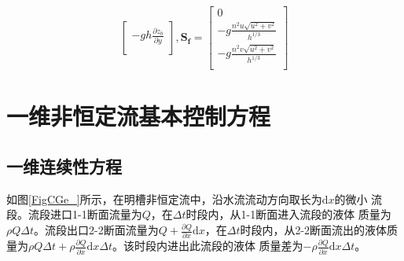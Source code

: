 \begin{equation}
\begin{bmatrix}
                                                            -gh\frac{\partial z_{b}}{\partial y} \\
                                                          \end{bmatrix}
                                                          ,
                                                          \mathbf{S_{f}} =
                                                          \begin{bmatrix}
                                                            0 \\
                                                            -g\frac{n^{2}u\sqrt{u^2+v^2}}{h^{1/3}} \\
                                                            -g\frac{n^{2}v\sqrt{u^2+v^2}}{h^{1/3}} \\
                                                          \end{bmatrix}
                                                        \end{equation}


                                                        \section{一维非恒定流基本控制方程}
                                                        \subsection{一维连续性方程}
                                                        如图\ref{FigCGe_}所示，在明槽非恒定流中，沿水流流动方向取长为$\mathrm{d}x$的微小
                                                        流段。流段进口1-1断面流量为$Q$，在$\Delta t$时段内，从1-1断面进入流段的液体
                                                        质量为$\rho Q\Delta t$。流段出口2-2断面流量为$Q+\frac{\partial Q}{\partial
                                                        x}\mathrm{d}x$，在$\Delta t$时段内，从2-2断面流出的液体质量为$\rho Q\Delta
                                                        t+\rho\frac{\partial Q}{\partial x}\mathrm{d}x\Delta t$。该时段内进出此流段的液体
                                                        质量差为$-\rho\frac{\partial Q}{\partial x}\mathrm{d}x\Delta t$。

